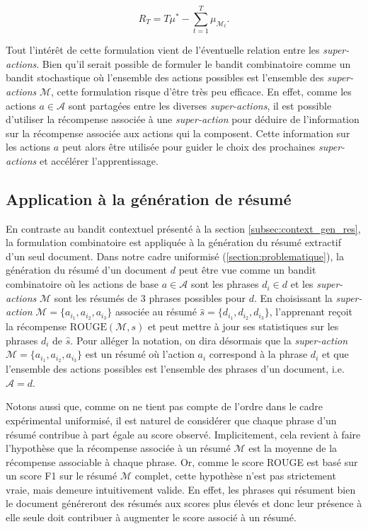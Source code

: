 \begin{equation}
    R_T = T \mu^* -  \sum_{t=1}^T  \mu_{\mathcal{M}_t}.
    \label{eq:regret_combi}
\end{equation}

Tout l'intérêt de cette formulation vient de l'éventuelle relation entre les \textit{super-actions}.
Bien qu'il serait possible de formuler le bandit combinatoire comme un bandit stochastique où l'ensemble des
actions possibles est l'ensemble des \textit{super-actions} $\mathcal{M}$, cette formulation
risque d'être très peu efficace.
En effet, comme les actions $a \in \mathcal{A}$ sont partagées entre les diverses \textit{super-actions},
il est possible d'utiliser la récompense associée à une \textit{super-action} pour
déduire de l'information sur la récompense associée aux actions qui la composent.
Cette information sur les actions $a$ peut alors être utilisée pour guider le choix des
prochaines \textit{super-actions} et accélérer l'apprentissage.

\subsection{Application à la génération de résumé}
\label{subsec:appli_gen_resume_ucb}

En contraste au bandit contextuel présenté à la section \ref{subsec:context_gen_res},
la formulation combinatoire est appliquée à la génération du résumé
extractif d'un seul document.
Dans notre cadre uniformisé (\ref{section:problematique}), la génération du résumé d'un document $d$ peut être vue comme un bandit combinatoire où
les actions de base $a \in \mathcal{A}$ sont les phrases $d_i \in d$ 
et les \textit{super-actions} $\mathcal{M}$ 
sont les résumés de 3 phrases possibles pour $d$.
En choisissant la \textit{super-action} $\mathcal{M} = \{a_{i_1},a_{i_2},a_{i_3}\}$ 
associée au résumé $\hat{s} = \{d_{i_1}, d_{i_2}, d_{i_3}\}$,
l'apprenant reçoit la récompense $\text{ROUGE}(\mathcal{M}, s)$ et peut mettre à jour ses
statistiques sur les phrases $d_i$ de $\hat{s}$.
Pour alléger la notation, on dira désormais que la \textit{super-action} 
$\mathcal{M} = \{a_{i_1},a_{i_2},a_{i_3}\}$ est un résumé 
où l'action $a_i$ correspond à la phrase $d_i$ et que l'ensemble 
des actions possibles est l'ensemble des phrases d'un document, i.e. $\mathcal{A} = d$.

Notons aussi que, comme on ne tient pas compte de l'ordre dans le cadre 
expérimental uniformisé,
il est naturel de considérer que chaque phrase d'un résumé contribue à part égale
au score observé.
Implicitement, cela revient à faire l'hypothèse que la récompense associée à un résumé
$\mathcal{M}$ est la moyenne de la récompense associable à chaque phrase.
Or, comme le score ROUGE est basé sur un score F1 sur le résumé $\mathcal{M}$ complet, cette hypothèse
n'est pas strictement vraie, mais demeure intuitivement valide.
En effet, les phrases qui résument bien le document généreront des résumés aux scores
plus élevés et donc leur présence à elle seule doit contribuer à augmenter le score
associé à un résumé.

